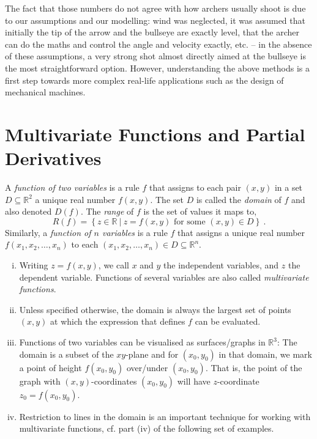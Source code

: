 The fact that those numbers do not agree with how archers usually shoot is due to our assumptions and our modelling: wind was neglected, it was assumed that initially the tip of the arrow and the bullseye are exactly level, that the archer can do the maths and control the angle and velocity exactly, etc. -- in the absence of these assumptions, a very strong shot almost directly aimed at the bullseye is the most straightforward option. However, understanding the above methods is a first step towards more complex real-life applications such as the design of mechanical machines.

\section{Multivariate Functions and Partial Derivatives}

\begin{definition}
A \emph{function of two variables} is a rule $f$ that assigns to each pair $(x,y)$ in a set $D\subseteq\mathbb{R}^2$ a unique real number $f(x,y)$. The set $D$ is called the \emph{domain} of $f$ and also denoted $D(f)$. The \emph{range} of $f$ is the set of values it maps to,
\[
R(f) = \left\{ z \in \mathbb{R} \: | \: z = f(x,y)\text{~for some~}(x,y)\in D  \right\} \:.
\]
Similarly, a \emph{function of $n$ variables} is a rule $f$ that assigns a unique real number $f(x_1,x_2,\dots,x_n)$ to each $(x_1,x_2,\dots,x_n) \in D\subseteq\mathbb{R}^n$.
\end{definition}

\begin{remark}
\begin{enumerate}[(i)]
	\item Writing $z=f(x,y)$, we call $x$ and $y$ the independent variables, and $z$ the dependent variable. Functions of several variables are also called \emph{multivariate functions}.
	\item Unless specified otherwise, the domain is always the largest set of points $(x,y)$ at which the expression that defines $f$ can be evaluated.
	\item Functions of two variables can be visualised as surfaces/graphs in $\mathbb{R}^3$: The domain is a subset of the $xy$-plane and for $(x_0,y_0)$ in that domain, we mark a point of height $f(x_0,y_0)$ over/under $(x_0,y_0)$. That is, the point of the graph with $(x,y)$-coordinates $(x_0,y_0)$ will have $z$-coordinate $z_0=f(x_0,y_0)$.
	\item Restriction to lines in the domain is an important technique for working with multivariate functions, cf. part (iv) of the following set of examples.
\end{enumerate}
\end{remark}

